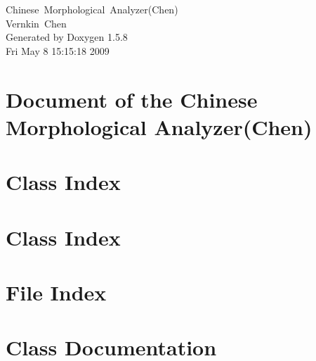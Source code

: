 \documentclass[a4paper]{book}
\begin{document}
\begin{titlepage}
\vspace*{7cm}
\begin{center}
{\Large Chinese~Morphological~Analyzer(Chen) \\[1ex]\large Vernkin~Chen }\\
\vspace*{1cm}
{\large Generated by Doxygen 1.5.8}\\
\vspace*{0.5cm}
{\small Fri May 8 15:15:18 2009}\\
\end{center}
\end{titlepage}
\clearemptydoublepage
{}
\tableofcontents
\clearemptydoublepage
{}
\chapter{Document of the Chinese Morphological Analyzer(Chen)}
\label{index}
\chapter{Class Index}

\chapter{Class Index}

\chapter{File Index}

\chapter{Class Documentation}






























\end{document}

